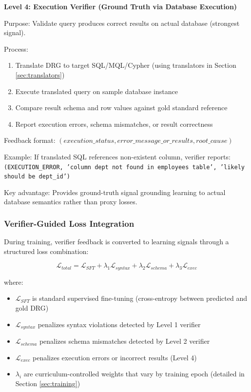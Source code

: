 \documentclass[conference]{IEEEtran}
\begin{document}
\textbf{Level 4: Execution Verifier (Ground Truth via Database Execution)}

Purpose: Validate query produces correct results on actual database (strongest signal).

Process:
\begin{enumerate}
\item Translate DRG to target SQL/MQL/Cypher (using translators in Section \ref{sec:translators})
\item Execute translated query on sample database instance
\item Compare result schema and row values against gold standard reference
\item Report execution errors, schema mismatches, or result correctness
\end{enumerate}

Feedback format: $(execution\_status, error\_message\_or\_results, root\_cause)$

Example: If translated SQL references non-existent column, verifier reports: \texttt{(EXECUTION\_ERROR, 'column dept not found in employees table', 'likely should be dept\_id')}

Key advantage: Provides ground-truth signal grounding learning to actual database semantics rather than proxy losses.

\subsubsection{Verifier-Guided Loss Integration}

During training, verifier feedback is converted to learning signals through a structured loss combination:

\begin{equation}
\mathcal{L}_{total} = \mathcal{L}_{SFT} + \lambda_1 \mathcal{L}_{syntax} + \lambda_2 \mathcal{L}_{schema} + \lambda_3 \mathcal{L}_{exec}
\end{equation}

where:
\begin{itemize}
\item $\mathcal{L}_{SFT}$ is standard supervised fine-tuning (cross-entropy between predicted and gold DRG)
\item $\mathcal{L}_{syntax}$ penalizes syntax violations detected by Level 1 verifier
\item $\mathcal{L}_{schema}$ penalizes schema mismatches detected by Level 2 verifier
\item $\mathcal{L}_{exec}$ penalizes execution errors or incorrect results (Level 4)
\item $\lambda_i$ are curriculum-controlled weights that vary by training epoch (detailed in Section \ref{sec:training})
\end{itemize}
\end{document}

